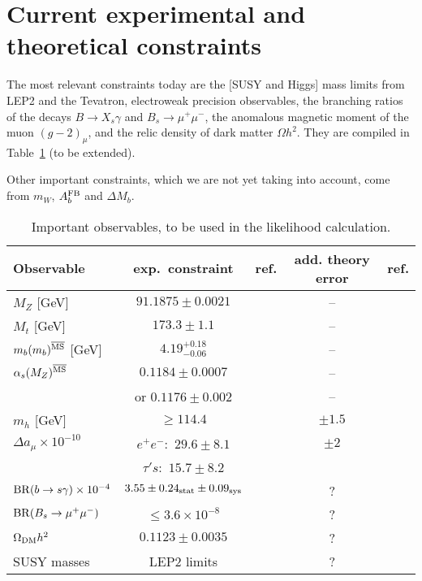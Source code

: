 \section{Current experimental and theoretical constraints}
\label{sec:limits}

The most relevant constraints today are the [SUSY and Higgs] mass 
limits from LEP2 and the Tevatron, electroweak precision observables, 
the branching ratios of the decays 
$B\to X_s\gamma$ and $B_s\to \mu^+\mu^-$, the anomalous magnetic moment of the 
muon $(g-2)_\mu$, and the relic density of dark matter $\Omega h^2$.  
They are compiled in Table~\ref{tab:observables} (to be extended).

Other important constraints, which we are not yet taking into account, 
come from $m_W$, $A^{\rm FB}_b$ and $\Delta M_{b}$.


\begin{table}[h]\begin{center}
\begin{tabular}{| l | c | c || c | l |}
  \hline
  Observable & exp.\ constraint & ref. & add. theory error & ref. \\ 
  \hline
  $M_Z$ [GeV] & $91.1875\pm 0.0021$ 
              & \cite{Nakamura:2010zzi} & -- & \\
  $M_t$ [GeV] & $173.3\pm 1.1$ 
              & \cite{top:1900yx} & -- & \\
  $m_b(m_b)^{\overline {\rm MS}}$ [GeV] &  $4.19^{+0.18}_{-0.06}$ 
                & \cite{Nakamura:2010zzi} & -- & \\
  $\alpha_s(M_Z)^{\overline {\rm MS}}$ & $0.1184\pm 0.0007$ & \cite{Nakamura:2010zzi} & -- & \\
          & or $0.1176\pm 0.002$ & \cite{Nakamura:2010zzi} & -- & \\
  \hline
  $m_h$ [GeV] & $\ge 114.4$ & \cite{Schael:2006cr} 
              & $\pm 1.5$ & \cite{Degrassi:2002fi} \\
  $\Delta a_\mu \times 10^{-10}$ 
       & $e^+e^-:$ $29.6\pm 8.1$ 
       & \cite{Davier:2010nc} & $\pm 2$ & \\
       & $\tau's:$ $15.7\pm 8.2$ 
       & \cite{xxx} &  & \\
  ${\rm BR}(b\to s\gamma)\times 10^{-4}$  
       & $3.55 \pm 0.24_{\rm stat}\pm 0.09_{\rm sys}$  
       & \cite{HFAG:2010qj}  & ? &  \\
  ${\rm BR}(B_s\to \mu^+\mu^-)$  
       & $\le 3.6 \times 10^{-8}$ & \cite{HFAG:2010qj} & ? &  \\
  $\Omega_{\rm DM} h^2$ 
       & $0.1123\pm 0.0035$ 
       & \cite{Jarosik:2010iu} 
       & ? &   \\
  SUSY masses & LEP2 limits 
              & \cite{lepsusy} 
	      & ? & \\
  \hline
\end{tabular}
\end{center}
\caption{\label{tab:observables} Important observables, to be used in the likelihood calculation. }
\end{table}

